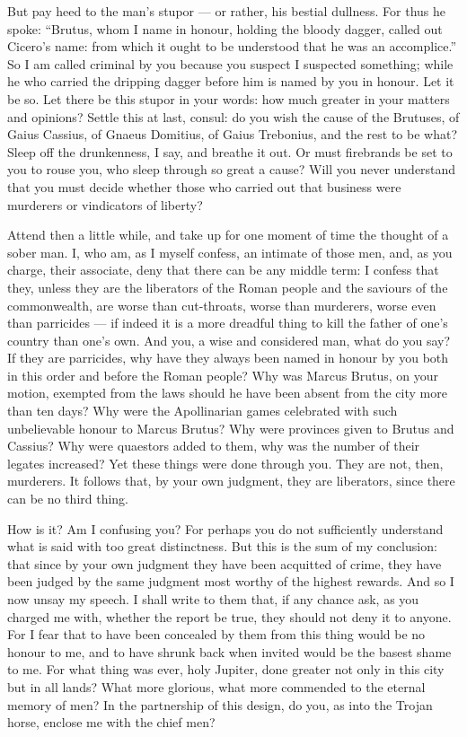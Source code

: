  But pay heed to the man's stupor --- or rather, his bestial dullness. For thus he spoke: ``Brutus, whom I name in honour, holding the bloody dagger, called out Cicero's name: from which it ought to be understood that he was an accomplice.'' So I am called criminal by you because you suspect I suspected something; while he who carried the dripping dagger before him is named by you in honour. Let it be so. Let there be this stupor in your words: how much greater in your matters and opinions? Settle this at last, consul: do you wish the cause of the Brutuses, of Gaius Cassius, of Gnaeus Domitius, of Gaius Trebonius, and the rest to be what? Sleep off the drunkenness, I say, and breathe it out. Or must firebrands be set to you to rouse you, who sleep through so great a cause? Will you never understand that you must decide whether those who carried out that business were murderers or vindicators of liberty?

 Attend then a little while, and take up for one moment of time the thought of a sober man. I, who am, as I myself confess, an intimate of those men, and, as you charge, their associate, deny that there can be any middle term: I confess that they, unless they are the liberators of the Roman people and the saviours of the commonwealth, are worse than cut-throats, worse than murderers, worse even than parricides --- if indeed it is a more dreadful thing to kill the father of one's country than one's own. And you, a wise and considered man, what do you say? If they are parricides, why have they always been named in honour by you both in this order and before the Roman people? Why was Marcus Brutus, on your motion, exempted from the laws should he have been absent from the city more than ten days? Why were the Apollinarian games celebrated with such unbelievable honour to Marcus Brutus? Why were provinces given to Brutus and Cassius? Why were quaestors added to them, why was the number of their legates increased? Yet these things were done through you. They are not, then, murderers. It follows that, by your own judgment, they are liberators, since there can be no third thing.

 How is it? Am I confusing you? For perhaps you do not sufficiently understand what is said with too great distinctness. But this is the sum of my conclusion: that since by your own judgment they have been acquitted of crime, they have been judged by the same judgment most worthy of the highest rewards. And so I now unsay my speech. I shall write to them that, if any chance ask, as you charged me with, whether the report be true, they should not deny it to anyone. For I fear that to have been concealed by them from this thing would be no honour to me, and to have shrunk back when invited would be the basest shame to me. For what thing was ever, holy Jupiter, done greater not only in this city but in all lands? What more glorious, what more commended to the eternal memory of men? In the partnership of this design, do you, as into the Trojan horse, enclose me with the chief men?

